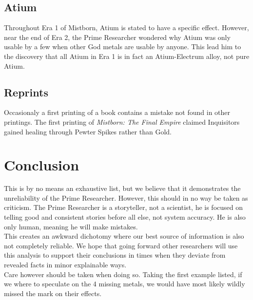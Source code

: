 \documentclass[conference]{IEEEtran}
\begin{document}
\subsection*{Atium}
Throughout Era 1 of Mistborn, Atium is stated to have a specific effect.  However, near the end of Era 2, the Prime Researcher wondered why Atium was only usable by a few when other God metals are usable by anyone.  This lead him to the discovery that all Atium in Era 1 is in fact an Atium-Electrum alloy, not pure Atium.\cite{atium-electrum}

\subsection*{Reprints}
Occasionaly a first printing of a book contains a mistake not found in other printings.  The first printing of \emph{Mistborn: The Final Empire} claimed Inquisitors gained healing through Pewter Spikes rather than Gold.

\section{Conclusion}
This is by no means an exhaustive list, but we believe that it demonstrates the unreliability of the Prime Researcher.  However, this should in no way be taken as criticism.  The Prime Researcher is a storyteller, not a scientist, he is focused on telling good and consistent stories before all else, not system accuracy.  He is also only human, meaning he will make mistakes.\\
This creates an awkward dichotomy where our best source of information is also not completely reliable.  We hope that going forward other researchers will use this analysis to support their conclusions in times when they deviate from revealed facts in minor explainable ways.\\

Care however should be taken when doing so.  Taking the first example listed, if we where to speculate on the 4 missing metals, we would have most likely wildly missed the mark on their effects. 



\newpage{}
{}

\end{document}
